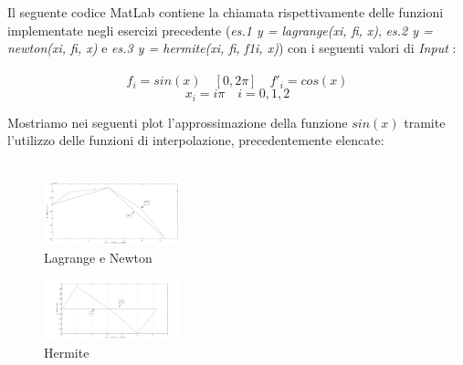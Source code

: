 Il seguente codice MatLab contiene la chiamata rispettivamente delle funzioni implementate negli esercizi precedente (\textit{es.1 y = lagrange(xi, fi, x)}, \textit{es.2 y = newton(xi, fi, x)} e \textit{es.3 y = hermite(xi, fi, f1i, x)}) con i seguenti valori di \textit{Input} :\\\ 
	\[
		f_i = sin(x) \quad [0,2\pi] \quad f'_i = cos(x)
	\]
	\[
		x_i = i\pi
		\quad
		i = 0,1,2
	\]
	
Mostriamo nei seguenti plot l'approssimazione della funzione $sin(x)$ tramite l'utilizzo delle funzioni di interpolazione, precedentemente elencate:\\\
	\begin{figure}[H]
		\label{Cap4_Es_4}
			\includegraphics[left, width=150px]{Plot/Cap_4_Es_4_Lagrange_Newton}
			\caption*{Lagrange e Newton}
	\end{figure}
	\begin{figure}[H]
		\label{Cap4_Es_4}
			\includegraphics[left, width=150px]{Plot/Cap_4_Es_4_Hermite}
			\caption*{Hermite}
	\end{figure}